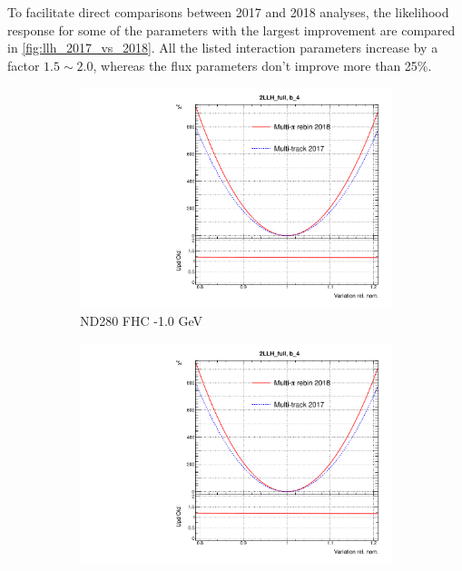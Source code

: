 To facilitate direct comparisons between 2017 and 2018 analyses, the likelihood response for some of the parameters with the largest improvement are compared in \autoref{fig:llh_2017_vs_2018}. All the listed interaction parameters increase by a factor $1.5\sim2.0$, whereas the flux parameters don't improve more than 25\%.
\begin{figure}[h]
	\centering
	\begin{subfigure}[t]{0.32\textwidth}
		\includegraphics[width=\textwidth,page=1, trim={0mm 0mm 0mm 9mm}, clip]{figures/mach3/2018/llh/MultiPi_vs_MultiTrack_TotalLLH_2017vs2018}
		\caption{ND280 FHC -1.0 GeV}
	\end{subfigure}
	\begin{subfigure}[t]{0.32\textwidth}
		\includegraphics[width=\textwidth,page=10, trim={0mm 0mm 0mm 9mm}, clip]{figures/mach3/2018/llh/MultiPi_vs_MultiTrack_TotalLLH_2017vs2018}

\end{subfigure}
\end{figure}
